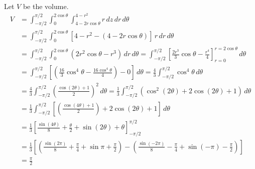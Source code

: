 \documentclass[a4paper, 12pt]{article}
\begin{document}
\begin{enumerate}[leftmargin=*,label=\textbf{\arabic*.}]
\begin{enumerate}[leftmargin=*,label=\textbf{\alph*.}]
\newpage

Let $V$ be the volume.
\begin{align*}
V&=\int_{-\pi/2}^{\pi/2}\int_{0}^{2\cos\theta}\int_{4-2r\cos\theta}^{4-r^2}r\,dz\,dr\,d\theta\\[1em]&=\int_{-\pi/2}^{\pi/2}\int_{0}^{2\cos\theta}\left[4-r^2-\left(4-2r\cos\theta\right)\right]\,r\,dr\,d\theta\\[1em]&=\int_{-\pi/2}^{\pi/2}\int_0^{2\cos\theta}(2r^2\cos\theta-r^3)\,dr\,d\theta=\int_{-\pi/2}^{\pi/2}\left[\frac{2r^3}3\cos\theta-\frac{r^4}4\right]_{r=0}^{r=2\cos\theta}\,d\theta\\[1em]&=\int_{-\pi/2}^{\pi/2}\left[\left(\frac{16}3\cos^4\theta-\frac{16\cos^4\theta}4\right) - 0\right]\,d\theta=\frac43\int_{-\pi/2}^{\pi/2}\cos^4\theta\,d\theta\\[1em]&=\frac43\int_{-\pi/2}^{\pi/2}\left(\frac{\cos(2\theta)+1}2\right)^2\,d\theta=\frac13\int_{-\pi/2}^{\pi/2}\left(\cos^2(2\theta)+2\cos(2\theta)+1\right)\,d\theta\\[1em]&=\frac13\int_{-\pi/2}^{\pi/2}\left[\left(\frac{\cos(4\theta)+1}2\right)+2\cos(2\theta)+1\right]\,d\theta\\[1em]&=\frac13\left[\frac{\sin(4\theta)}8+\frac\theta2+\sin(2\theta)+\theta\right]_{-\pi/2}^{\pi/2}\\[1em]&=\frac13\left[\left(\frac{\sin(2\pi)}8+\frac\pi4+\sin\pi+\frac\pi2\right)-\left(\frac{\sin\left(-2\pi\right)}8-\frac\pi4+\sin(-\pi)-\frac\pi2\right)\right]\\[1em]&=\boxed{\frac\pi2}
\end{align*}

\end{enumerate}
\end{enumerate}
\end{document}
